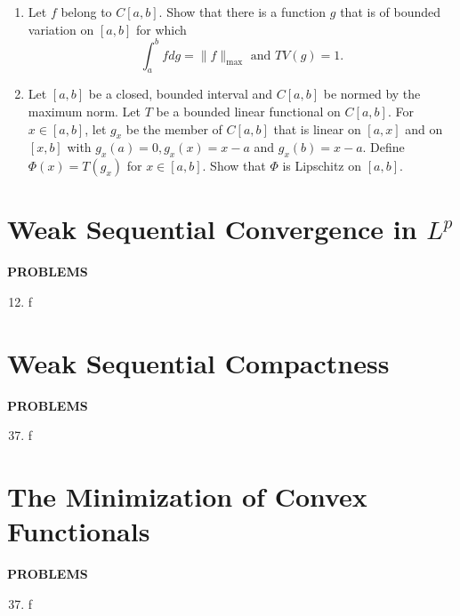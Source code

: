 \begin{enumerate}
    \item Let $f$ belong to $C[a,b]$. Show that there is a function $g$ that is of bounded variation on $[a,b]$ for which 
    \[
        \int_a^bfdg=\|f\|_{\max}\text{ and }TV(g)=1.  
    \]
    \item Let $[a,b]$ be a closed, bounded interval and $C[a,b]$ be normed by the maximum norm. Let $T$ be a bounded linear functional on $C[a,b]$.
    For $x\in[a,b]$, let $g_x$ be the member of $C[a,b]$ that is linear on $[a,x]$ and on $[x,b]$ with $g_x(a)=0,g_x(x)=x-a$ and $g_x(b)=x-a$. Define $\Phi(x)=T(g_x)$ for $x\in[a,b]$. Show that $\Phi$ is Lipschitz on $[a,b]$.
\end{enumerate}

\section{Weak Sequential Convergence in $L^p$}
\begin{center}
	\textbf{PROBLEMS}
\end{center}
\begin{enumerate}
	\setcounter{enumi}{11}
    \item f
\end{enumerate}

\section{Weak Sequential Compactness}
\begin{center}
	\textbf{PROBLEMS}
\end{center}
\begin{enumerate}
	\setcounter{enumi}{36}
    \item f
\end{enumerate}

\section{The Minimization of Convex Functionals}
\begin{center}
	\textbf{PROBLEMS}
\end{center}
\begin{enumerate}
	\setcounter{enumi}{36}
    \item f
\end{enumerate}
